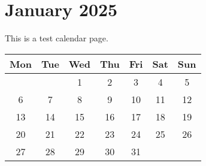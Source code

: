 \section*{January 2025}

This is a test calendar page.

\begin{tabular}{|c|c|c|c|c|c|c|}
\hline
Mon & Tue & Wed & Thu & Fri & Sat & Sun \\
\hline
& & 1 & 2 & 3 & 4 & 5 \\
6 & 7 & 8 & 9 & 10 & 11 & 12 \\
13 & 14 & 15 & 16 & 17 & 18 & 19 \\
20 & 21 & 22 & 23 & 24 & 25 & 26 \\
27 & 28 & 29 & 30 & 31 & & \\
\hline
\end{tabular}